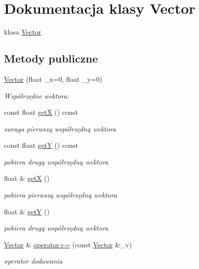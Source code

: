 \hypertarget{class_vector}{}\section{Dokumentacja klasy Vector}
\label{class_vector}


klasa \hyperlink{class_vector}{Vector}  


\subsection*{Metody publiczne}
\begin{DoxyCompactItemize}
\item 
\hyperlink{class_vector_af3c1b04bfbb10e29433842202365a6c4}{Vector} (float \+\_\+x=0, float \+\_\+y=0)
\begin{DoxyCompactList}\small\item\em Współrzędne wektora. \end{DoxyCompactList}\item 
const float \hyperlink{class_vector_a56cbc43a18559f85f4ce7278e98f9aad}{get\+X} () const 
\begin{DoxyCompactList}\small\item\em zwraga pierwszą współrzędną wektora \end{DoxyCompactList}\item 
const float \hyperlink{class_vector_a4ad8e8a5fb48ce193177af11340831b6}{get\+Y} () const 
\begin{DoxyCompactList}\small\item\em pobiera drugą współrzędną wektora \end{DoxyCompactList}\item 
float \& \hyperlink{class_vector_aeca06c929d4ab3078a828723a88621e6}{get\+X} ()
\begin{DoxyCompactList}\small\item\em pobiera pierwszą współrzędną wektora \end{DoxyCompactList}\item 
float \& \hyperlink{class_vector_ab0cc77ce300a60de0ab734555886ad5d}{get\+Y} ()
\begin{DoxyCompactList}\small\item\em pobiera drugą współrzędną wektora \end{DoxyCompactList}\item 
\hyperlink{class_vector}{Vector} \& \hyperlink{class_vector_a4eeab5be24ee846de3012e67a4e34820}{operator+=} (const \hyperlink{class_vector}{Vector} \&\+\_\+v)
\begin{DoxyCompactList}\small\item\em operator dodawania \end{DoxyCompactList}\item 

\end{DoxyCompactItemize}
